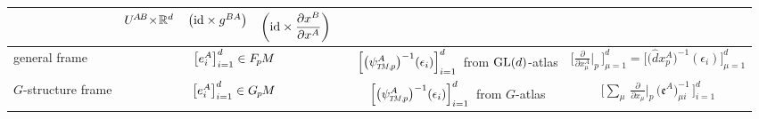 \begin{tabular}{ @{\ \ } l r@{\,}r@{\ }c@{\ }l cc @{\ \ } }
        & $U^{\mkern-2muA\mkern-2muB} \mkern-4mu\times\! \mathbb{R}^d$
        & $\big(\mathrm{id} \times g^{BA} \big)$
        & $\displaystyle \bigg( \mathrm{id} \times \frac{\partial x^B}{\partial x^A} \bigg)$
    \\
    \midrule[0.07em] %
    general frame
        & \multicolumn{4}{c}{$\big[ e^A_i \big]_{i=1}^d \in F_{\mkern-1.5mu p}\mkern-1.0muM$}
        & $\Big[ \big(\psiTMp^A\big)^{-1} (\epsilon_i) \Big]_{i=1}^d$\ from $\operatorname{GL}(d)$-atlas
        & $\displaystyle \bigg[\frac{\partial}{\partial x^A_\mu} \bigg|_p \,\bigg]_{\mu=1}^d = \Big[ \big(\hat{d}x^A_p \big)^{-1} (\epsilon_i) \Big]_{\mu=1}^d$
    \\
    $G$-structure frame
        & \multicolumn{4}{c}{$\big[ e^A_i \big]_{i=1}^d \in G_{\mkern-1.3mu p}\mkern-1.2muM$}
        & $\Big[ \big(\psiTMp^A\big)^{-1} (\epsilon_i) \Big]_{i=1}^d$\ from $G$-atlas \kern16pt
        & $\displaystyle \bigg[\sum\nolimits_{\mu}\, \frac{\partial}{\partial x_\mu} \bigg|_p\, \big( \mathfrak{e}^A \big)^{-1}_{\!\mu i}\, \bigg]_{i=1}^d$
    \\
    \bottomrule
\end{tabular}
